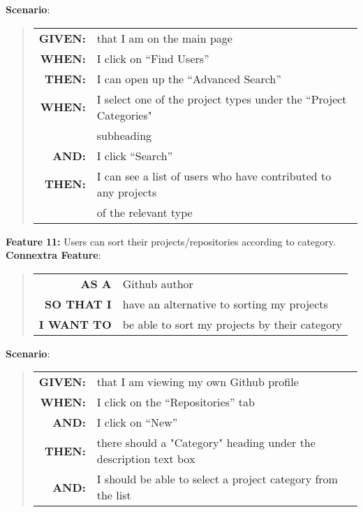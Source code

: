 \documentclass[12pt]{article}
\newcommand{\Feature}[1]{ 
   \noindent \textbf{Feature} #1
}
\newcommand{\GivenSc} {
	\noindent \textbf{GIVEN:}
	}
\newcommand{\WhenSc} {
	\noindent \textbf{WHEN:}
	}
\newcommand{\AndSc} {
	\noindent \textbf{AND:}
	}
\newcommand{\ThenSc} {
	\noindent \textbf{THEN:}
	}
\begin{document}
\begin{framed}
\noindent \textbf{Scenario}:
\begin{quote}
\begin{tabular}{rl}
\GivenSc & that I am on the main page\\
\WhenSc  & I click on ``Find Users''\\
\ThenSc  & I can open up the ``Advanced Search''\\
\WhenSc  & I select one of the project types under the ``Project Categories"\\
         & subheading\\ 
\AndSc   & I click ``Search''\\
\ThenSc  & I can see a list of users who have contributed to any projects \\
         & of the relevant type
\end{tabular}
\end{quote}

\pagebreak

\noindent \Feature{\textbf{11:} Users can sort their projects/repositories according to category.}\\[0.2cm]

\noindent \textbf{Connextra Feature}:
\begin{quote}
\begin{tabular}{rl}
\textbf{AS A}      & \textsf{Github} author\\
\textbf{SO THAT I} & have an alternative to sorting my projects\\
\textbf{I WANT TO} & be able to sort my projects by their category \\
\end{tabular}
\end{quote}


\noindent \textbf{Scenario}:
\begin{quote}
\begin{tabular}{rl}
\GivenSc & that I am viewing my own \textsf{Github} profile\\
\WhenSc  & I click on the ``Repositories'' tab\\
\AndSc   & I click on ``New''\\
\ThenSc  & there should a "Category" heading under the description text box\\
\AndSc   & I should be able to select a project category from the list
\end{tabular}
\end{quote}


\end{framed}
\end{document}
